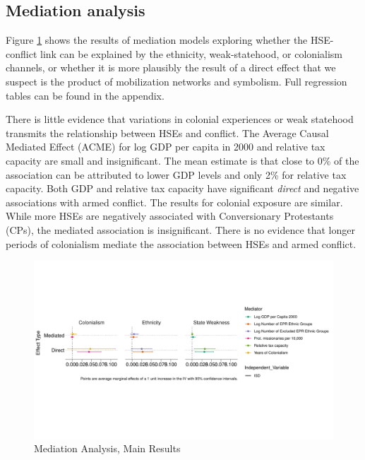 
\subsection{Mediation analysis}

Figure \ref{Fig: Mediation} shows the results of mediation models exploring
whether the HSE-conflict link can be explained by the ethnicity, weak-statehood,
or colonialism channels, or whether it is more plausibly the result of a direct
effect that we suspect is the product of mobilization networks and symbolism.
Full regression tables can be found in the appendix.

There is little evidence that variations in colonial experiences or weak
statehood transmits the relationship between HSEs and conflict. The Average
Causal Mediated Effect (ACME) for log GDP per capita in 2000 and relative tax
capacity are small and insignificant. The mean estimate is that close to 0\% of
the association can be attributed to lower GDP levels and only 2\% for relative
tax capacity. Both GDP and relative tax capacity have significant
\textit{direct} and negative associations with armed conflict. The results for
colonial exposure are similar. While more HSEs are negatively associated with
Conversionary Protestants (CPs), the mediated association is insignificant.
There is no evidence that longer periods of colonialism mediate the association
between HSEs and armed conflict.   

\begin{figure}[!htb] \includegraphics[width=\textwidth]{img/mediation_plot.pdf}
\caption{Mediation Analysis, Main Results} \label{Fig: Mediation} \end{figure}

